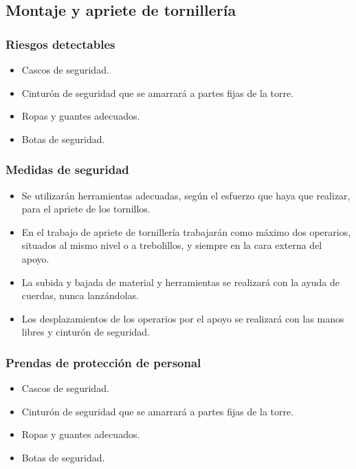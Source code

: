 \subsection{Montaje y apriete de tornillería}
\label{subsec:sys-riesgosTornilleria}
\subsubsection{Riesgos detectables}
\label{subsubsec:sysTornilleria-RD}
\begin{itemize}
    \item Cascos de seguridad.
    \item Cinturón de seguridad que se amarrará a partes fijas de la torre.
    \item Ropas y guantes adecuados.
    \item Botas de seguridad.
\end{itemize}
\subsubsection{Medidas de seguridad}
\label{subsubsec:sysTornilleria-MS}
\begin{itemize}
    \item Se utilizarán herramientas adecuadas, según el esfuerzo que haya que realizar, para el apriete de los tornillos.
    \item En el trabajo de apriete de tornillería trabajarán como máximo dos operarios, situados al mismo nivel o a trebolillos, y siempre en la cara externa del apoyo.
    \item La subida y bajada de material y herramientas se realizará con la ayuda de cuerdas, nunca lanzándolas.
    \item Los desplazamientos de los operarios por el apoyo se realizará con las manos libres y cinturón de seguridad.
\end{itemize}
\subsubsection{Prendas de protección de personal}
\label{subsubsec:sysTornilleria-EPI}
\begin{itemize}
    \item Cascos de seguridad.
    \item Cinturón de seguridad que se amarrará a partes fijas de la torre.
    \item Ropas y guantes adecuados.
    \item Botas de seguridad.
\end{itemize}
